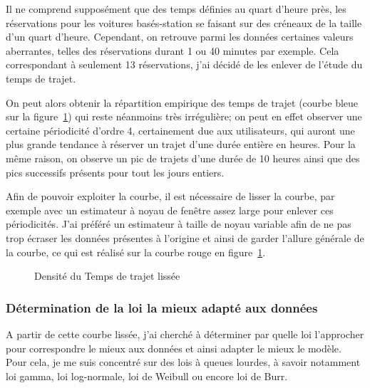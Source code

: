 \documentclass[12pt,a4paper]{article}
\theoremstyle{definition}
\begin{document}
{Il ne comprend supposément que des temps définies au quart d'heure près, les réservations pour les voitures basés-station se faisant sur des créneaux de la taille d'un quart d'heure. Cependant, on retrouve parmi les données certaines valeurs aberrantes, telles des réservations durant 1 ou 40 minutes par exemple.  Cela correspondant à seulement 13 réservations, j'ai décidé de les enlever de l'étude du temps de trajet.

On peut alors obtenir la répartition empirique des temps de trajet (courbe bleue sur la figure~\ref{lissage_courbe}) qui reste néanmoins très irrégulière; on peut en effet observer une certaine périodicité d'ordre 4, certainement due aux utilisateurs, qui auront une plus grande tendance à réserver un trajet d'une durée entière en heures. Pour la même raison, on observe un pic de trajets d'une durée de 10 heures ainsi que des pics successifs présents pour tout les jours entiers.

Afin de pouvoir exploiter la courbe, il est nécessaire de lisser la courbe, par exemple avec un estimateur à noyau de fenêtre assez large pour enlever ces périodicités. J'ai préféré un estimateur à taille de noyau variable afin de ne pas trop écraser les données présentes à l'origine et ainsi de garder l'allure générale de la courbe, ce qui est réalisé sur la courbe rouge en figure~\ref{lissage_courbe}.


\begin{figure} [h]
\centering
{}
\caption{Densité du Temps de trajet lissée}
\label{lissage_courbe}
\end{figure}


\subsubsection{Détermination de la loi la mieux adapté aux données}

A partir de cette courbe lissée, j'ai cherché à déterminer par quelle loi l'approcher pour correspondre le mieux aux données et ainsi adapter le mieux le modèle. Pour cela, je me suis concentré sur des lois à queues lourdes, à savoir notamment loi gamma, loi log-normale, loi de Weibull ou encore loi de Burr.

}
\end{document}
